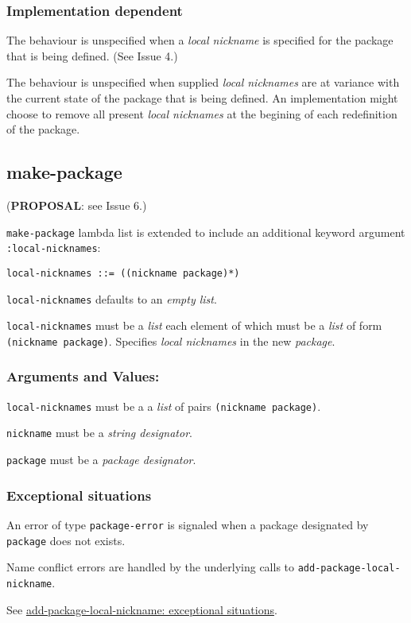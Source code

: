 \documentclass[11pt]{article}
\begin{document}
\subsubsection{Implementation dependent}
\label{sec:org7983f95}
The behaviour is unspecified when a \emph{local nickname} is specified for the package
that is being defined. (See Issue 4.)

The behaviour is unspecified when supplied \emph{local nicknames} are at variance with
the current state of the package that is being defined. An implementation might
choose to remove all present \emph{local nicknames} at the begining of each
redefinition of the package.
\subsection{make-package}
\label{sec:orgd56e37d}
(\textbf{PROPOSAL}: see Issue 6.)

\texttt{make-package} lambda list is extended to include an additional keyword argument
\texttt{:local-nicknames}:
\begin{verbatim}
local-nicknames ::= ((nickname package)*)
\end{verbatim}


\texttt{local-nicknames} defaults to an \emph{empty list}.

\texttt{local-nicknames} must be a \emph{list} each element of which must be a \emph{list} of form
\texttt{(nickname package)}. Specifies \emph{local nicknames} in the new \emph{package}.
\subsubsection{Arguments and Values:}
\label{sec:org430df28}
\texttt{local-nicknames} must be a a \emph{list} of pairs \texttt{(nickname package)}.

\texttt{nickname} must be a \emph{string designator}.

\texttt{package} must be a \emph{package designator}.
\subsubsection{Exceptional situations}
\label{sec:orgb4df8e7}
An error of type \texttt{package-error} is signaled when a package designated by
\texttt{package} does not exists.

Name conflict errors are handled by the underlying calls to
\texttt{add-package-local-nickname}.

See \hyperref[sec:org4b1c53c]{add-package-local-nickname: exceptional situations}.
\end{document}

